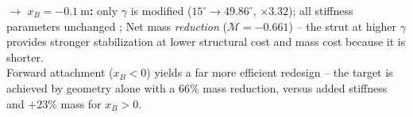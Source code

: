 \noindent \small
$\to$ \textbf{$x_B=-0.1\ \mathrm{m}$:} only $\gamma$ is modified ($15^\circ\to49.86^\circ$, $\times3.32$); all stiffness parameters unchanged ; Net mass \emph{reduction} ($\mathcal{M}=-0.661$) -- the strut at higher $\gamma$ provides stronger stabilization at lower structural cost and mass cost because it is shorter.\\

\noindent\small
Forward attachment ($x_B<0$) yields a far more efficient redesign -- the target is achieved by geometry alone with a 66\% mass reduction, versus added stiffness and $+23\%$ mass for $x_B>0$.